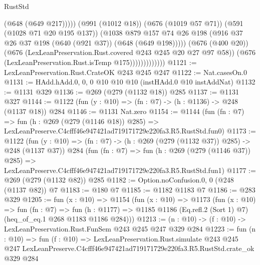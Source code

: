 \begin{lexlean}{RustStd}
\begin{coremodule}
                                  (@648 (@649 @217)))))
                            (@991 (@1012 @18))
                            (@676 (@1019 @57 @71))
                            (@591 (@1028 @71 @20 @195 @137))
                            (@1038
                              @879
                              @157
                              @74
                              @26
                              @198
                              (@916 @37 @26 @37 @198 (@640 (@921 @37)) (@648 (@649 @198)))))
                          (@676 (@400 @20))
                          (@676 (LexLeanPreservation.Rust.covered @243 @245 @20 @27 @97 @58))
                          (@676 (LexLeanPreservation.Rust.isTemp @175)))))))))))))
@1121 := LexLeanPreservation.Rust.CrateOK @243 @245 @247
@1122 := Nat.casesOn.{0}
@1131 := HAdd.hAdd.{0, 0, 0} @10 @10 @10 (instHAdd.{0} @10 instAddNat)
@1132 := @1131 @329
@1136 := @269 (@279 (@1132 @18)) @285
@1137 := @1131 @327
@1144 := @1122 (fun (y : @10) => (fn : @7) -> (h : @1136) -> @248 (@1137 @18)) @284
@1146 := @1131 Nat.zero
@1154 := @1144
    (fun (fn : @7) =>
    fun (h : @269 (@279 (@1146 @18)) @285) =>
    LexLeanPreserve.C4cfff46e947421ad719171729e220fa3.R5.RustStd.fun0)
@1173 := @1122
    (fun (y : @10) => (fn : @7) -> (h : @269 (@279 (@1132 @37)) @285) -> @248 (@1137 @37))
    @284
    (fun (fn : @7) =>
    fun (h : @269 (@279 (@1146 @37)) @285) =>
    LexLeanPreserve.C4cfff46e947421ad719171729e220fa3.R5.RustStd.fun1)
@1177 := @269 (@279 (@1132 @82)) @285
@1182 := Option.noConfusion.{0, 0} (@248 (@1137 @82)) @7
@1183 := @180 @7
@1185 := @1182 @1183 @7
@1186 := @283 @329
@1205 := fun (x : @10) =>
  @1154
    (fun (x : @10) =>
    @1173
      (fun (x : @10) =>
      fun (fn : @7) =>
      fun (h : @1177) =>
      @1185 @1186 (Eq.refl.{2} (Sort 1) @7) (heq_of_eq.{1} @268 @1183 @1186 @284)))
@1213 := (n : @10) -> (f : @10) -> LexLeanPreservation.Rust.FunSem @243 @245 @247 @329 @284
@1223 := fun (n : @10) =>
  fun (f : @10) =>
  LexLeanPreservation.Rust.simulate
    @243
    @245
    @247
    LexLeanPreserve.C4cfff46e947421ad719171729e220fa3.R5.RustStd.crate_ok
    @329
    @284
\end{coremodule}
\end{lexlean}
